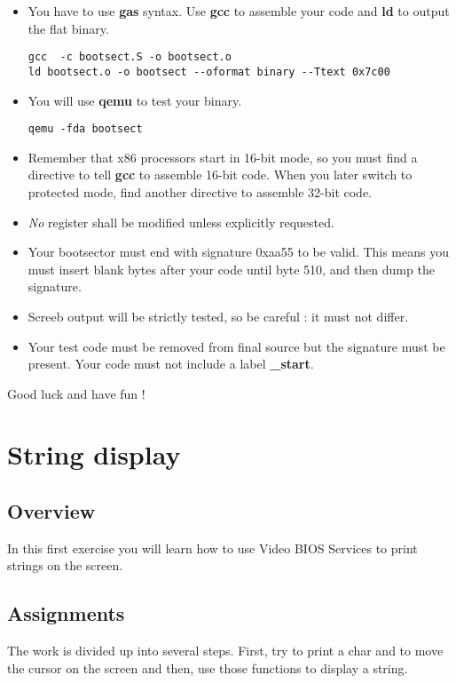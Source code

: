\begin{itemize}
\item
  You have to use \textbf{gas} syntax. Use \textbf{gcc} to assemble your
  code and \textbf{ld} to output the flat binary.
  \begin{verbatim}
gcc  -c bootsect.S -o bootsect.o
ld bootsect.o -o bootsect --oformat binary --Ttext 0x7c00
  \end{verbatim}
\item
  You will use \textbf{qemu} to test your binary.
  \begin{verbatim}
qemu -fda bootsect
  \end{verbatim}
\item
  Remember that x86 processors start in 16-bit mode, so you must find a
  directive to tell \textbf{gcc} to assemble 16-bit code. When you later
  switch to protected mode, find another directive to assemble 32-bit code.
\item
  \emph{No} register shall be modified unless explicitly requested.
\item
  Your bootsector must end with signature 0xaa55 to be valid. This means you
  must insert blank bytes after your code until byte 510, and then dump
  the signature.
\item
  Screeb output will be strictly tested, so be careful : it must not
  differ.
\item
  Your test code must be removed from final source but the signature must be
  present. Your code must not include a label \textbf{\_start}.
\end{itemize}

Good luck and have fun !

%
%

\newpage

\section{String display}

\subsection*{Overview}
In this first exercise you will learn how to use Video BIOS Services to
print strings on the screen.

\subsection*{Assignments}
The work is divided up into several steps. First, try to print a char and
to move the cursor on the screen and then, use those functions to display
a string.


